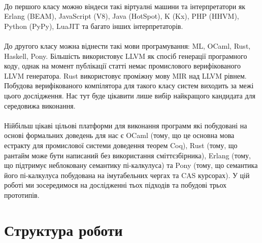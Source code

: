 \paragraph{}
До першого класу можно віндеси такі віртуалні машини та інтерпретатори як
Erlang (BEAM), JavaScript (V8), Java (HotSpot), K (Kx), PHP (HHVM), Python (PyPy), LuaJIT
та багато інших інтерпретаторів.

\paragraph{}
До другого класу можна віднести такі мови програмування: ML, OCaml, Rust,
Haskell, Pony. Більшість використовує LLVM як спосіб генерації програмного коду,
однак на момент публікації статті немає промислового верифікованого LLVM генератора.
Rust використовує проміжну мову MIR над LLVM рівнем. Побудова верифікованого компілятора
для такого класу систем виходить за межі цього дослідження. Нас тут буде цікавити
лише вибір найкращого кандидата для середовижа виконання.

\paragraph{}
Нійбільш цікаві цільові платформи для виконання программ
які побудовані на основі формальних доведень для нас є OCaml (тому,
що це основна мова естракту для промислової системи доведення теорем Coq),
Rust (тому, що рантайм може бути написаний без використання сміттєзбірника),
Erlang (тому, що підтримує неблоковану семантику пі-калкулуса)
та Pony (тому, що семантика його пі-калкулуса побудована на імутабельних чергах та CAS курсорах).
У цій роботі ми зосередимося на дослідженні тьох підходів
та побудові трьох прототипів.

\newpage
\section{Структура роботи}

\begin{center}
\end{center}

